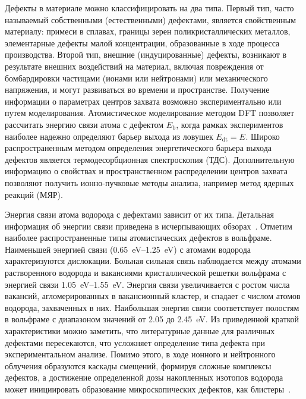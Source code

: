 Дефекты в материале можно классифицировать на два типа. Первый тип, часто называемый собственными (естественными) дефектами, является свойственным материалу: примеси в сплавах, границы зерен поликристаллических металлов, элементарные дефекты малой концентрации, образованные в ходе процесса производства. Второй тип, внешние (индуцированные) дефекты, возникают в результате внешних воздействий на материал, включая повреждения от бомбардировки частицами (ионами или нейтронами) или механического напряжения, и могут развиваться во времени и пространстве. Получение информации о параметрах центров захвата возможно экспериментально или путем моделирования. Атомистическое моделирование методом DFT позволяет рассчитать энергию связи атома с дефектом \( E_\mathrm{b} \), когда рамках экспериментов наиболее надежно определяют барьер выхода из ловушек \( E_\mathrm{dt}=E_\mathrm{} \). Широко распространенным методом определения энергетического барьера выхода дефектов является термодесорбционная спектроскопия (ТДС). Дополнительную информацию о свойствах и пространственном распределении центров захвата позволяют получить ионно-пучковые методы анализа, например метод ядерных реакций (МЯР). 


Энергия связи атома водорода с дефектами зависит от их типа. Детальная информация об энергии связи приведена в исчерпывающих обзорах~\cite{Ogorodnikova2015,Li2020,Persianova2024}. Отметим наиболее распространенные типы атомистических дефектов в вольфраме. Наименьшей энергией связи (\SIrange{0.65}{1.25}{\electronvolt}) с атомами водорода характеризуются дислокации. Больная сильная связь наблюдается между атомами растворенного водорода и вакансиями кристаллической решетки вольфрама с энергией связи \SIrange{1.05}{1.55}{\electronvolt}. Энергия связи увеличивается с ростом числа вакансий, агломерированных в вакансионный кластер, и спадает с числом атомов водорода, захваченных в них. Наибольшая энергия связи соответствует полостям в вольфраме с диапазоном значений от \num{2.05} до \SI{2.45}{\electronvolt}. Из приведенной краткой характеристики можно заметить, что литературные данные для различных дефектами пересекаются, что усложняет определение типа дефекта при экспериментальном анализе. Помимо этого, в ходе ионного и нейтронного облучения образуются каскады смещений, формируя сложные комплексы дефектов, а достижение определенной дозы накопленных изотопов водорода может инициировать образование микроскопических дефектов, как блистеры~\cite{Wang2001}. 

